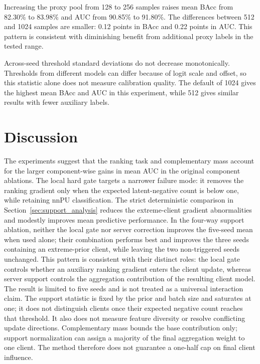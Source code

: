 \documentclass[lettersize,journal]{IEEEtran}
\begin{document}
Increasing the proxy pool from 128 to 256 samples raises mean BAcc from 82.30\% to 83.98\% and AUC from 90.85\% to 91.80\%. The differences between 512 and 1024 samples are smaller: 0.12 points in BAcc and 0.22 points in AUC. This pattern is consistent with diminishing benefit from additional proxy labels in the tested range.

Across-seed threshold standard deviations do not decrease monotonically. Thresholds from different models can differ because of logit scale and offset, so this statistic alone does not measure calibration quality. The default of 1024 gives the highest mean BAcc and AUC in this experiment, while 512 gives similar results with fewer auxiliary labels.


\FloatBarrier

\section{Discussion}

The experiments suggest that the ranking task and complementary mass account for the larger component-wise gains in mean AUC in the original component ablations. The local hard gate targets a narrower failure mode: it removes the ranking gradient only when the expected latent-negative count is below one, while retaining nnPU classification. The strict deterministic comparison in Section~\ref{sec:support_analysis} reduces the extreme-client gradient abnormalities and modestly improves mean predictive performance. In the four-way support ablation, neither the local gate nor server correction improves the five-seed mean when used alone; their combination performs best and improves the three seeds containing an extreme-prior client, while leaving the two non-triggered seeds unchanged. This pattern is consistent with their distinct roles: the local gate controls whether an auxiliary ranking gradient enters the client update, whereas server support controls the aggregation contribution of the resulting client model. The result is limited to five seeds and is not treated as a universal interaction claim. The support statistic is fixed by the prior and batch size and saturates at one; it does not distinguish clients once their expected negative count reaches that threshold. It also does not measure feature diversity or resolve conflicting update directions. Complementary mass bounds the base contribution only; support normalization can assign a majority of the final aggregation weight to one client. The method therefore does not guarantee a one-half cap on final client influence.
\end{document}
